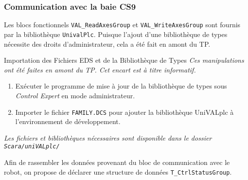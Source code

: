 \subsubsection{Communication avec la baie CS9}

Les blocs fonctionnels \texttt{VAL\_ReadAxesGroup} et \texttt{VAL\_WriteAxesGroup} sont fournis par la bibliothèque \texttt{UnivalPlc}. Puisque l'ajout d'une bibliothèque de types nécessite des droits d'administrateur, cela a été fait en amont du TP.

\begin{UPSTIinfor}{Importation des Fichiers EDS et de la Bibliothèque de Types}
    \textit{Ces manipulations ont été faites en amont du TP. Cet encart est à titre informatif.}
    \begin{enumerate}
        \item Exécuter le programme de mise à jour de la bibliothèque de types sous \textit{Control Expert} en mode administrateur.
        \item Importer le fichier \texttt{FAMILY.DCS} pour ajouter la bibliothèque UniVALplc à l'environnement de développement.
    \end{enumerate}
    \textit{Les fichiers et bibliothèques nécessaires sont disponible dans le dossier \texttt{Scara/uniVALplc/}}
\end{UPSTIinfor}


\begin{UPSTIManipulation}
    Afin de rassembler les données provenant du bloc de communication avec le robot, on propose de déclarer une structure de données \texttt{T\_CtrlStatusGroup}. 
    

\end{UPSTIManipulation}
    

